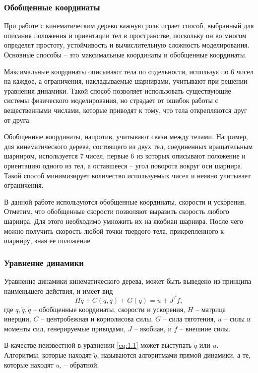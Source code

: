 \subsubsection{Обобщенные координаты}

При работе с кинематическим дерево важную роль играет способ, выбранный для описания положения и ориентации тел в пространстве, поскольку он во многом определят простоту, устойчивость и вычислительную сложность моделирования. Основные способы -- это максимальные координаты и обобщенные координаты.

Максимальные координаты описывают тела по отдельности, используя по 6 чисел на каждое, а ограничения, накладываемые шарнирами, учитывают при решении уравнения динамики. Такой способ позволяет использовать существующие системы физического моделирования, но страдает от ошибок работы с вещественными числами, которые приводят к тому, что тела открепляются друг от друга.

Обобщенные координаты, напротив, учитывают связи между телами. Например, для кинематического дерева, состоящего из двух тел, соединенных вращательным шарниром, используется 7 чисел, первые 6 из которых описывают положение и ориентацию одного из тел, а оставшееся -- угол поворота вокруг оси шарнира. Такой способ минимизирует количество используемых чисел и неявно учитывает ограничения.

В данной работе используются обобщенные координаты, скорости и ускорения. Отметим, что обобщенные скорости позволяют выразить скорость любого шарнира. Для этого необходимо умножить их на якобиан шарнира. После чего можно получить скорость любой точки твердого тела, прикрепленного к шарниру, зная ее положение.

\subsubsection{Уравнение динамики}

Уравнение динамики кинематического дерева, может быть выведено из принципа наименьшего действия, и имеет вид
\begin{equation*}
  H \ddot{q} + C(q, \dot{q}) + G(q) = u + J^{T} f, \tag{1.1}\label{eq:1.1}
\end{equation*}
где $q, \dot{q}, \ddot{q}$ -- обобщенные координаты, скорости и ускорения, $H$ -- матрица инерции, $C$ -- центробежная и кориолисова силы, $G$ -- сила тяготения, $u$ -- силы и моменты сил, генерируемые приводами, $J$ -- якобиан, и $f$ -- внешние силы.

В качестве неизвестной в уравнении \ref{eq:1.1} может выступать $\ddot{q}$ или $u$. Алгоритмы, которые находят $\ddot{q}$, называются алгоритмами прямой динамики, а те, которые находят $u$, -- обратной.

